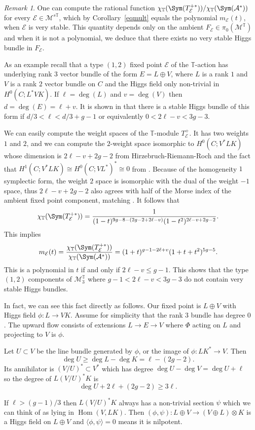 \documentclass[12pt]{article}
\numberwithin{equation}{section}
\theoremstyle{remark}
\newtheorem{remark}[theorem]{Remark}
\theoremstyle{definition}
\numberwithin{theorem}{section}
\def\beq{\begin{eqnarray}}
\def\eeq{\end{eqnarray}}
\def\calE{{\mathcal E}}
\DeclareMathOperator{\Hom}{Hom}
\def\M{{\mathcal{M}}}
\def\calA{{\mathcal{A}}}
\newcommand{\T}{{\mathbb{T}}}
\renewcommand{\1}{\mathbbm{1}}
\begin{document}
\begin{remark} \label{counter}
	One can compute  the rational function ${{ \chi_\T(\Sym(T^{+*}_\calE))/ \chi_\T(\Sym(\calA^*))}}$ for every $\calE\in \M^{s\T}$, which by 
	Corollary~\ref{eqmult} equals the polynomial $m_{\calE}(t)$, when $\calE$ is very stable. This quantity depends only on the ambient $F_\calE\in \pi_0(\M^\T)$ and when it is not a polynomial, we  deduce that there exists no very stable Higgs bundle in $F_\calE$. 
	
	As an example recall \cite{gothen} that a type $(1,2)$ fixed point $\calE$ of the $\T$-action has underlying rank $3$ vector bundle of the form $E=L\oplus V$, where $L$ is a rank $1$ and $V$ is a rank $2$ vector bundle on $C$ and
	the Higgs field only non-trivial in $H^0(C;L^{*}VK)$. If $\ell=\deg(L)$ and $v=\deg(V)$ then $d=\deg(E)=\ell+v$. It is shown in \cite[Proposition 2.5]{gothen} that there is a stable Higgs bundle of this form if $ d/3<\ell<d/3+g-1$ or equivalently $0<2\ell-v<3g-3$. 
	
	We can easily compute the weight spaces of the $\T$-module 
	$T^+_\calE$. It has two weights $1$ and $2$, and we can compute the $2$-weight space isomorphic to $H^0(C;V^*LK)$ whose dimension is $2\ell-v+2g-2$ from Hirzebruch-Riemann-Roch and the fact that $H^1(C;V^*LK)\cong H^0(C;VL^*)^*\cong 0$ from \cite[proof of Proposition 4.2]{gothen}. Because of the homogeneity $1$ symplectic form,  the weight $2$ space is isomorphic with the dual of the weight $-1$ space, thus $2\ell-v+2g-2$ also agrees with half of the Morse index of the ambient fixed point component, matching \cite[Proposition 4.2.i]{gothen}. It follows that  $$\chi_\T(\Sym(T_\calE^{+*}))={1\over(1-t)^{9g-8-(2g-2+2\ell-v)}(1-t^2)^{2\ell-v+2g-2}}.$$ This implies \beq \label{nonpol}m_\calE(t)={{ \chi_\T(\Sym(T^{+*}_\calE))\over \chi_\T(\Sym(\calA^*))}}=(1+t)^{g-1-2\ell+v}(1+t+t^2)^{5g-5}.\eeq
	This is a polynomial in $t$  if and only if  $2\ell-v\leq g-1$. This shows that the type $(1,2)$ components of $
	\M_3^\T$ where $g-1<2\ell-v<3g-3$ do not contain very stable Higgs bundles.
	
	In fact, we can see this fact directly as follows. Our fixed point is $L\oplus V$ with Higgs field $\phi:L\rightarrow VK$. Assume for simplicity that the rank $3$ bundle has degree $0$. The upward flow consists of extensions $L\rightarrow E\rightarrow V$ where $\Phi$ acting on $L$ and projecting to $V$ is $\phi$.
	
	Let $U\subset V$ be the line bundle generated by $\phi$, or the image of $\phi:LK^*\rightarrow V$. Then 
	$$\deg U\ge \deg L-\deg K=\ell-(2g-2).$$
	Its annihilator is $(V/U)^*\subset V^*$ which has degree 
	$\deg U-\deg V=\deg U+\ell$ so the degree of $L(V/U)^*K$ is 
	$$\deg U+2\ell +(2g-2)\ge 3\ell.$$
	
	If $\ell>(g-1)/3$ then $L(V/U)^*K$ always has a non-trivial section $\psi$ which we can think of as lying in $\Hom(V, LK)$.
	Then $(\phi,\psi):L\oplus V\rightarrow (V\oplus L)\otimes K$ is a Higgs field on $L\oplus V$ and $\langle \phi,\psi\rangle = 0$ means it is nilpotent. 
	
	
\end{remark}
\end{document}
